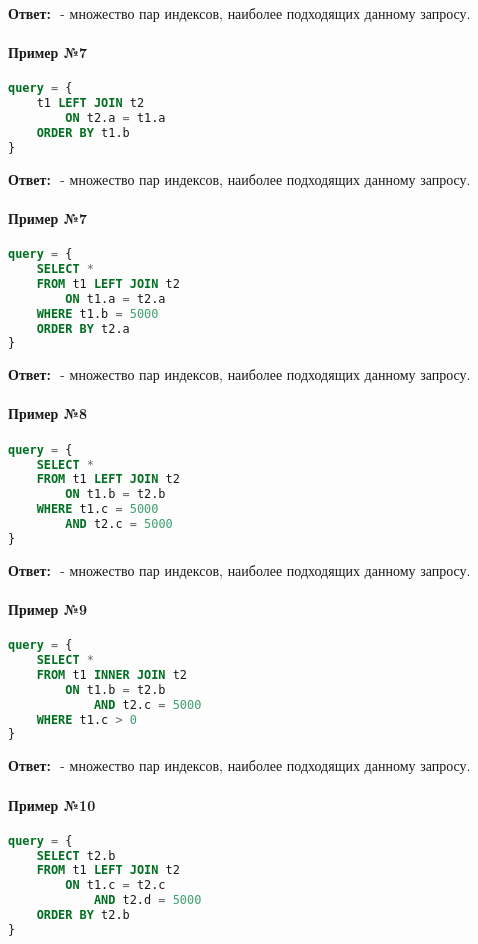 \textbf{Ответ:} ${}$ - множество пар индексов, наиболее подходящих данному запросу.

\paragraph{Пример №7}
\begin{lstlisting}[language=SQL]
query = {
    t1 LEFT JOIN t2
        ON t2.a = t1.a
    ORDER BY t1.b
}
\end{lstlisting}

\textbf{Ответ:} ${}$ - множество пар индексов, наиболее подходящих данному запросу.

\paragraph{Пример №7}
\begin{lstlisting}[language=SQL]
query = {
    SELECT *
    FROM t1 LEFT JOIN t2
        ON t1.a = t2.a
    WHERE t1.b = 5000
    ORDER BY t2.a
}
\end{lstlisting}

\textbf{Ответ:} ${}$ - множество пар индексов, наиболее подходящих данному запросу.

\paragraph{Пример №8}
\begin{lstlisting}[language=SQL]
query = {
    SELECT *
    FROM t1 LEFT JOIN t2
        ON t1.b = t2.b
    WHERE t1.c = 5000
        AND t2.c = 5000
}
\end{lstlisting}

\textbf{Ответ:} ${}$ - множество пар индексов, наиболее подходящих данному запросу.

\paragraph{Пример №9}
\begin{lstlisting}[language=SQL]
query = {
    SELECT *
    FROM t1 INNER JOIN t2
        ON t1.b = t2.b
            AND t2.c = 5000
    WHERE t1.c > 0
}
\end{lstlisting}

\textbf{Ответ:} ${}$ - множество пар индексов, наиболее подходящих данному запросу.


\paragraph{Пример №10}
\begin{lstlisting}[language=SQL]
query = {
    SELECT t2.b
    FROM t1 LEFT JOIN t2
        ON t1.c = t2.c
            AND t2.d = 5000
    ORDER BY t2.b
}
\end{lstlisting}

